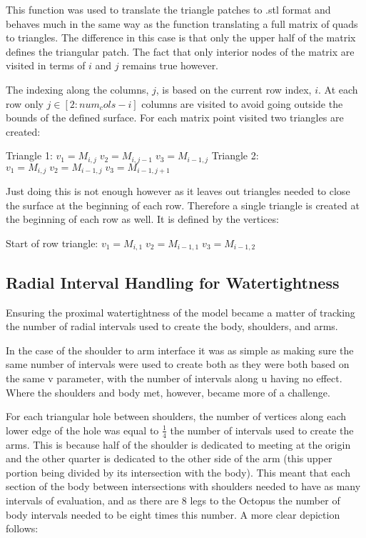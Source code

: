 \documentclass[twocolumn]{article}
\begin{document}
This function was used to translate the triangle patches to .stl format and behaves much in the same way as the function translating a full matrix of quads to triangles. The difference in this case is that only the upper half of the matrix defines the triangular patch. The fact that only interior nodes of the matrix are visited in terms of $i$ and $j$ remains true however.

The indexing along the columns, $j$, is based on the current row index, $i$.  At each row only $j \in [2:num_cols-i]$ columns are visited to avoid going outside the bounds of the defined surface. For each matrix point visited two triangles are created:

Triangle 1:
$v_1 = M_{i,j} \; v_2= M_{i,j-1} \; v_3 = M_{i-1,j} $
Triangle 2:
$v_1 = M_{i,j} \; v_2= M_{i-1,j} \; v_3 = M_{i-1,j+1} $

Just doing this is not enough however as it leaves out triangles needed to close the surface at the beginning of each row. Therefore a single triangle is created at the beginning of each row as well. It is defined by the vertices:

Start of row triangle:
$v_1 = M_{i,1} \; v_2= M_{i-1,1} \; v_3 = M_{i-1,2} $


\subsection{Radial Interval Handling for Watertightness}

Ensuring the proximal watertightness of the model became a matter of tracking the number of radial intervals used to create the body, shoulders, and arms.

In the case of the shoulder to arm interface it was as simple as making sure the same number of intervals were used to create both as they were both based on the same v parameter, with the number of intervals along u having no effect. Where the shoulders and body met, however, became more of a challenge.

For each triangular hole between shoulders, the number of vertices along each lower edge of the hole was equal to $\frac{1}{4}$ the number of intervals used to create the arms. This is because half of the shoulder is dedicated to meeting at the origin and the other quarter is dedicated to the other side of the arm (this upper portion being divided by its intersection with the body). This meant that each section of the body between intersections with shoulders needed to have as many intervals of evaluation, and as there are 8 legs to the Octopus the number of body intervals needed to be eight times this number. A more clear depiction follows:
\end{document}
